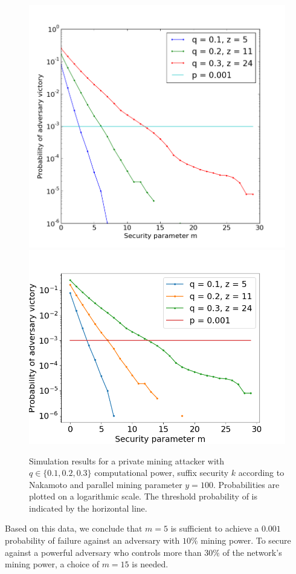 \begin{figure}
    \caption{\label{fig.nipopow-attack-experiment}
        Simulation results for a private mining attacker with $q \in \{0.1,
        0.2, 0.3\}$ computational power, suffix security $k$ according to
        Nakamoto and parallel mining parameter $y = 100$. Probabilities are
        plotted on a logarithmic scale. The threshold probability of
        \cite{bitcoin} is indicated by the horizontal line.
    }
    \centering
    \iftwocolumn
        \includegraphics[width=\columnwidth,keepaspectratio]{figures/nipopow-attack-experiment.png}
    \else
        \includegraphics[width=0.5\columnwidth,keepaspectratio]{figures/nipopow-attack-experiment-onecolumn.png}
    \fi
\end{figure}

Based on this data, we conclude that $m = 5$ is sufficient to achieve a $0.001$
probability of failure against an adversary with $10\%$ mining power. To secure
against a powerful adversary who controls more than $30\%$ of the network's
mining power, a choice of $m = 15$ is needed.
